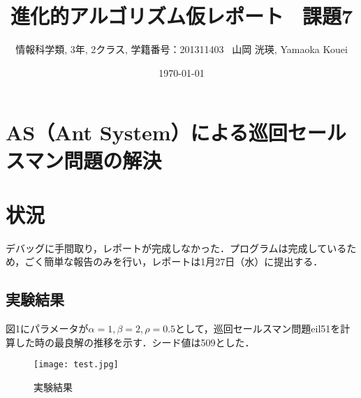 \documentclass[a4j]{jarticle}
\title{進化的アルゴリズム仮レポート \ 課題7}
\author{情報科学類, 3年, 2クラス, 学籍番号：201311403 \ 山岡 洸瑛, Yamaoka
Kouei}
\date{\today}
\begin{document}
\maketitle

\section*{AS（Ant System）による巡回セールスマン問題の解決}
\section*{状況}
デバッグに手間取り，レポートが完成しなかった．プログラムは完成しているため，ごく簡単な報告のみを行い，レポートは1月27日（水）に提出する．
\subsection*{実験結果}
図1にパラメータが$\alpha=1, \beta=2, \rho = 0.5$として，巡回セールスマン問題eil51を計算した時の最良解の推移を示す．シード値は509とした．
\begin{figure}[htb]
 \begin{center}
  \texttt{[image: test.jpg]}
  \caption{実験結果}
  \label{nasi}
 \end{center}
\end{figure}
\end{document}
